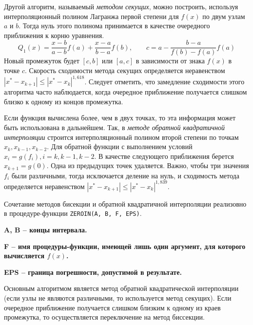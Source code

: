 Другой алгоритм, называемый \emph{методом секущих}, можно построить, используя интерполяционный полином Лагранжа
первой степени для $f(x)$ по двум узлам $a$ и $b$. Тогда нуль этого полинома принимается в качестве очередного
приближения к корню уравнения.
\begin{equation*}
    Q_1(x) = \frac{x - b}{a - b}f(a) + \frac{x - a}{b - a}f(b), \qquad c = a - \frac{b - a}{f(b) - f(a)}f(a)
\end{equation*}
Новый промежуток будет $[c, b]$ или $[a, c]$ в зависимости от знака $f(x)$ в точке $c$. Скорость сходимости метода
секущих определяется неравенством $\displaystyle \left| x^* - x_{k+1} \right| \leq \left| x^* - x_k \right|^{1,618}$.
Следует отметить, что замедление сходимости этого алгоритма часто наблюдается, когда очередное приближение
получается слишком близко к одному из концов промежутка.

Если функция вычислена более, чем в двух точках, то эта информация может быть использована в дальнейшем. Так, в
\emph{методе обратной квадратичной интерполяции} строится интерполяционный полином второй степени по точкам
$x_k, x_{k-1}, x_{k-2}$. Для обратной функции с выполнением условий $\displaystyle x_i = g(f_i), i = k, k-1, k-2$.
В качестве следующего приближения берется $\displaystyle x_{k+1} = g(0)$. Одна из предыдущих точек удаляется.
Важно, чтобы три значения $f_i$ были различными, тогда исключается деление на нуль, и сходимость метода определяется
неравенством $\displaystyle \left| x^* - x_{k+1} \right| \leq \left| x^* - x_k \right|^{1,839}$.
\vspace{10pt}

Сочетание методов бисекции и обратной квадратичной интерполяции реализовно в процедуре-функции \verb|ZEROIN(A, B, F, EPS)|.

\bf{A}, \bf{B} -- концы интервала.

\bf{F} -- имя процедуры-функции, имеющей лишь один аргумент, для которого вычисляется $f(x)$.

\bf{EPS} -- граница погрешности, допустимой в результате.
\vspace{10pt}

Основным алгоритмом является метод обратной квадратической интерполяции (если узлы не являются различными, то
используется метод секущих). Если очередное приближение получается слишком близким к одному из краев промежутка, то
осуществляется переключение на метод биссекции.
